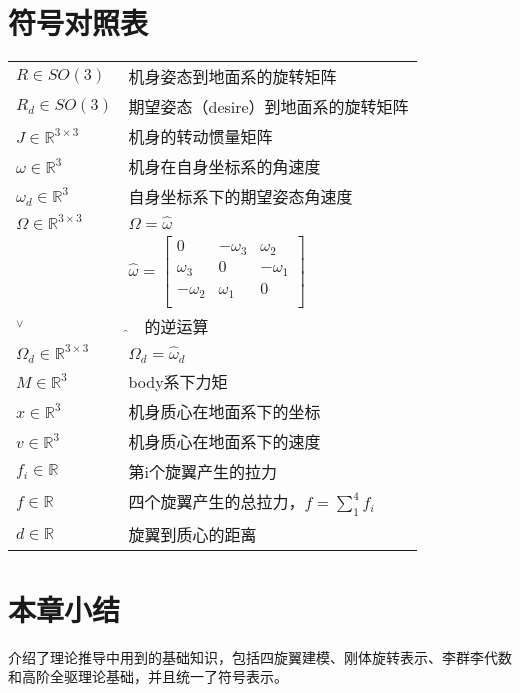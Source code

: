 \section{符号对照表}
\begin{longtable}{ll}
  $R \in SO(3)$                            & 机身姿态到地面系的旋转矩阵     \\
  $R_d \in SO(3)$                          & 期望姿态（desire）到地面系的旋转矩阵   \\
  $J\in \mathbb{R}^{3 \times 3}$           & 机身的转动惯量矩阵           \\
  $\omega \in \mathbb{R}^{3}$              & 机身在自身坐标系的角速度         \\
  $\omega_d \in \mathbb{R}^{3}$            & 自身坐标系下的期望姿态角速度 \\
  $\Omega  \in  \mathbb{R}^{3 \times 3}$   & $\Omega=\widehat \omega $   \\
  $\widehat{}$ &
  $\widehat \omega =\begin{bmatrix}
    0 &-\omega_3  &\omega_2  \\
    \omega_3 & 0 & -\omega_1 \\
    -\omega_2 & \omega_1 & 0 \\
    \end{bmatrix}$   \\

    ${}^\vee$ & $\widehat{} \quad$的逆运算 \\
  $\Omega_d  \in  \mathbb{R}^{3 \times 3}$ & $\Omega_d=\widehat \omega_d$     \\
  $M\in \mathbb{R}^{3}$                   & body系下力矩                 \\  
  $x\in \mathbb{R}^{3}$ & 机身质心在地面系下的坐标\\
  $v\in \mathbb{R}^{3}$ & 机身质心在地面系下的速度\\
  $f_i\in \mathbb{R}$ & 第i个旋翼产生的拉力 \\
  $f\in \mathbb{R}$  & 四个旋翼产生的总拉力，$f=\sum_{1}^{4} f_i$\\
  $d\in \mathbb{R}$ & 旋翼到质心的距离 \\
\end{longtable}

\section{本章小结}
介绍了理论推导中用到的基础知识，包括四旋翼建模、刚体旋转表示、李群李代数和高阶全驱理论基础，并且统一了符号表示。